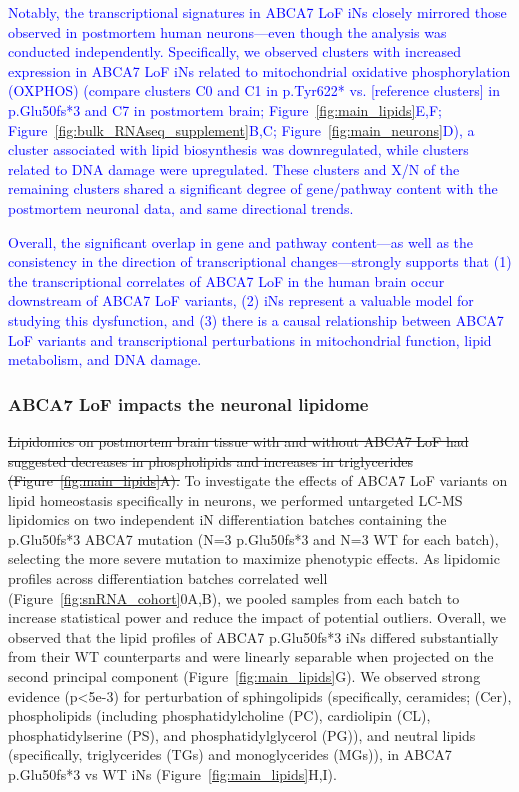 \textcolor{blue}{Notably, the transcriptional signatures in ABCA7 LoF iNs closely mirrored those observed in postmortem human neurons—even though the analysis was conducted independently. Specifically, we observed clusters with increased expression in ABCA7 LoF iNs related to mitochondrial oxidative phosphorylation (OXPHOS) (compare clusters C0 and C1 in p.Tyr622* vs. [reference clusters] in p.Glu50fs*3 and C7 in postmortem brain; Figure~\ref{fig:main_lipids}E,F; Figure~\ref{fig:bulk_RNAseq_supplement}B,C; Figure~\ref{fig:main_neurons}D), a cluster associated with lipid biosynthesis was downregulated, while clusters related to DNA damage were upregulated. These clusters and X/N of the remaining clusters shared a significant degree of gene/pathway content with the postmortem neuronal data, and same directional trends.}

\textcolor{blue}{Overall, the significant overlap in gene and pathway content—as well as the consistency in the direction of transcriptional changes—strongly supports that (1) the transcriptional correlates of ABCA7 LoF in the human brain occur downstream of ABCA7 LoF variants, (2) iNs represent a valuable model for studying this dysfunction, and (3) there is a causal relationship between ABCA7 LoF variants and transcriptional perturbations in mitochondrial function, lipid metabolism, and DNA damage.}

\subsubsection{ABCA7 LoF impacts the neuronal lipidome}
\sout{Lipidomics on postmortem brain tissue with and without ABCA7 LoF had suggested decreases in phospholipids and increases in triglycerides (Figure~\ref{fig:main_lipids}A).} To investigate the effects of ABCA7 LoF variants on lipid homeostasis specifically in neurons, we performed untargeted LC-MS lipidomics on two independent iN differentiation batches containing the p.Glu50fs*3 ABCA7 mutation (N=3 p.Glu50fs*3 and N=3 WT for each batch), selecting the more severe mutation to maximize phenotypic effects. As lipidomic profiles across differentiation batches correlated well (Figure~\ref{fig:snRNA_cohort}0A,B), we pooled samples from each batch to increase statistical power and reduce the impact of potential outliers. Overall, we observed that the lipid profiles of ABCA7 p.Glu50fs*3 iNs differed substantially from their WT counterparts and were linearly separable when projected on the second principal component (Figure~\ref{fig:main_lipids}G). We observed strong evidence (p<5e-3) for perturbation of sphingolipids (specifically, ceramides; (Cer), phospholipids (including phosphatidylcholine (PC), cardiolipin (CL), phosphatidylserine (PS), and phosphatidylglycerol (PG)), and neutral lipids (specifically, triglycerides (TGs) and monoglycerides (MGs)), in ABCA7 p.Glu50fs*3 vs WT iNs (Figure~\ref{fig:main_lipids}H,I). 

